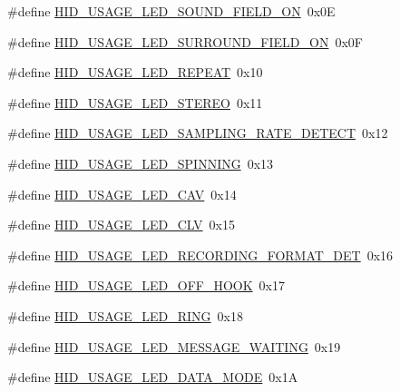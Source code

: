 \begin{DoxyCompactItemize}
\item 
\#define \hyperlink{group__USBD__HID_gaeef30310a72f3d8f1d28072fd7a19f54}{H\-I\-D\-\_\-\-U\-S\-A\-G\-E\-\_\-\-L\-E\-D\-\_\-\-S\-O\-U\-N\-D\-\_\-\-F\-I\-E\-L\-D\-\_\-\-O\-N}~0x0\-E
\item 
\#define \hyperlink{group__USBD__HID_ga61e0c8c0c1b6ff63d989949e2531d412}{H\-I\-D\-\_\-\-U\-S\-A\-G\-E\-\_\-\-L\-E\-D\-\_\-\-S\-U\-R\-R\-O\-U\-N\-D\-\_\-\-F\-I\-E\-L\-D\-\_\-\-O\-N}~0x0\-F
\item 
\#define \hyperlink{group__USBD__HID_ga5a27afb3743c02f2ede9359644ab9865}{H\-I\-D\-\_\-\-U\-S\-A\-G\-E\-\_\-\-L\-E\-D\-\_\-\-R\-E\-P\-E\-A\-T}~0x10
\item 
\#define \hyperlink{group__USBD__HID_ga3e8bdb62fd252fa8d4493e0a4bcd1452}{H\-I\-D\-\_\-\-U\-S\-A\-G\-E\-\_\-\-L\-E\-D\-\_\-\-S\-T\-E\-R\-E\-O}~0x11
\item 
\#define \hyperlink{group__USBD__HID_ga2750d16d17aadf3cb97f3adf876dbab5}{H\-I\-D\-\_\-\-U\-S\-A\-G\-E\-\_\-\-L\-E\-D\-\_\-\-S\-A\-M\-P\-L\-I\-N\-G\-\_\-\-R\-A\-T\-E\-\_\-\-D\-E\-T\-E\-C\-T}~0x12
\item 
\#define \hyperlink{group__USBD__HID_ga1bf00631eeefe9751ac97aa87318df9a}{H\-I\-D\-\_\-\-U\-S\-A\-G\-E\-\_\-\-L\-E\-D\-\_\-\-S\-P\-I\-N\-N\-I\-N\-G}~0x13
\item 
\#define \hyperlink{group__USBD__HID_gaf5179627220cbb877f14982f00d36c61}{H\-I\-D\-\_\-\-U\-S\-A\-G\-E\-\_\-\-L\-E\-D\-\_\-\-C\-A\-V}~0x14
\item 
\#define \hyperlink{group__USBD__HID_gac8a9a7f08802f62c76663f2e4d42ce20}{H\-I\-D\-\_\-\-U\-S\-A\-G\-E\-\_\-\-L\-E\-D\-\_\-\-C\-L\-V}~0x15
\item 
\#define \hyperlink{group__USBD__HID_gabceb203a1ddf8ce343ea401ebe30ea89}{H\-I\-D\-\_\-\-U\-S\-A\-G\-E\-\_\-\-L\-E\-D\-\_\-\-R\-E\-C\-O\-R\-D\-I\-N\-G\-\_\-\-F\-O\-R\-M\-A\-T\-\_\-\-D\-E\-T}~0x16
\item 
\#define \hyperlink{group__USBD__HID_gadffeac25955768384e14af34a418af39}{H\-I\-D\-\_\-\-U\-S\-A\-G\-E\-\_\-\-L\-E\-D\-\_\-\-O\-F\-F\-\_\-\-H\-O\-O\-K}~0x17
\item 
\#define \hyperlink{group__USBD__HID_ga7814936fe33a3630d7c2d61be32bc44b}{H\-I\-D\-\_\-\-U\-S\-A\-G\-E\-\_\-\-L\-E\-D\-\_\-\-R\-I\-N\-G}~0x18
\item 
\#define \hyperlink{group__USBD__HID_ga2c8171fd81b8878924ebf9c510a8e3fe}{H\-I\-D\-\_\-\-U\-S\-A\-G\-E\-\_\-\-L\-E\-D\-\_\-\-M\-E\-S\-S\-A\-G\-E\-\_\-\-W\-A\-I\-T\-I\-N\-G}~0x19
\item 
\#define \hyperlink{group__USBD__HID_ga9fb720115913b930bb78194a33179dca}{H\-I\-D\-\_\-\-U\-S\-A\-G\-E\-\_\-\-L\-E\-D\-\_\-\-D\-A\-T\-A\-\_\-\-M\-O\-D\-E}~0x1\-A

\end{DoxyCompactItemize}
